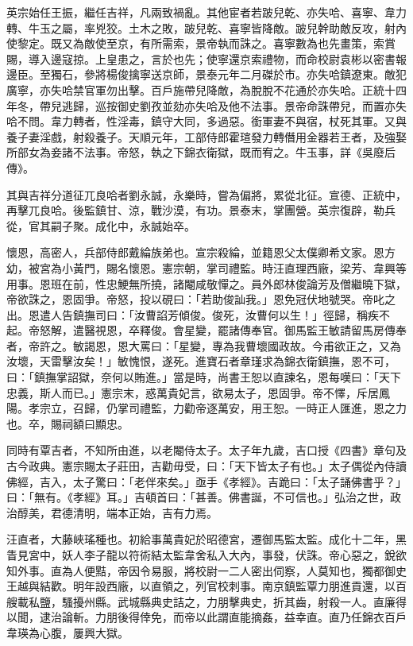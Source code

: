 \begin{pinyinscope}
英宗始任王振，繼任吉祥，凡兩致禍亂。其他宦者若跛兒乾、亦失哈、喜寧、韋力轉、牛玉之屬，率兇狡。土木之敗，跛兒乾、喜寧皆降敵。跛兒幹助敵反攻，射內使黎定。既又為敵使至京，有所需索，景帝執而誅之。喜寧數為也先畫策，索賞賜，導入邊寇掠。上皇患之，言於也先；使寧還京索禮物，而命校尉袁彬以密書報邊臣。至獨石，參將楊俊擒寧送京師，景泰元年二月磔於市。亦失哈鎮遼東。敵犯廣寧，亦失哈禁官軍勿出擊。百戶施帶兒降敵，為脫脫不花通於亦失哈。正統十四年冬，帶兒逃歸，巡按御史劉孜並劾亦失哈及他不法事。景帝命誅帶兒，而置亦失哈不問。韋力轉者，性淫毒，鎮守大同，多過惡。銜軍妻不與宿，杖死其軍。又與養子妻淫戲，射殺養子。天順元年，工部侍郎霍瑄發力轉僭用金器若王者，及強娶所部女為妾諸不法事。帝怒，執之下錦衣衛獄，既而宥之。牛玉事，詳《吳廢后傳》。

其與吉祥分道征兀良哈者劉永誠，永樂時，嘗為偏將，累從北征。宣德、正統中，再擊兀良哈。後監鎮甘、涼，戰沙漠，有功。景泰末，掌團營。英宗復辟，勒兵從，官其嗣子聚。成化中，永誠始卒。

懷恩，高密人，兵部侍郎戴綸族弟也。宣宗殺綸，並籍恩父太僕卿希文家。恩方幼，被宮為小黃門，賜名懷恩。憲宗朝，掌司禮監。時汪直理西廠，梁芳、韋興等用事。恩班在前，性忠鯁無所撓，諸閹咸敬憚之。員外郎林俊論芳及僧繼曉下獄，帝欲誅之，恩固爭。帝怒，投以硯曰：「若助俊訕我。」恩免冠伏地號哭。帝叱之出。恩遣人告鎮撫司曰：「汝曹諂芳傾俊。俊死，汝曹何以生！」徑歸，稱疾不起。帝怒解，遣醫視恩，卒釋俊。會星變，罷諸傳奉官。御馬監王敏請留馬房傳奉者，帝許之。敏謁恩，恩大罵曰：「星變，專為我曹壞國政故。今甫欲正之，又為汝壞，天雷擊汝矣！」敏愧恨，遂死。進寶石者章瑾求為錦衣衛鎮撫，恩不可，曰：「鎮撫掌詔獄，奈何以賄進。」當是時，尚書王恕以直諫名，恩每嘆曰：「天下忠義，斯人而已。」憲宗末，惑萬貴妃言，欲易太子，恩固爭。帝不懌，斥居鳳陽。孝宗立，召歸，仍掌司禮監，力勸帝逐萬安，用王恕。一時正人匯進，恩之力也。卒，賜祠額曰顯忠。

同時有覃吉者，不知所由進，以老閹侍太子。太子年九歲，吉口授《四書》章句及古今政典。憲宗賜太子莊田，吉勸毋受，曰：「天下皆太子有也。」太子偶從內侍讀佛經，吉入，太子驚曰：「老伴來矣。」亟手《孝經》。吉跪曰：「太子誦佛書乎？」曰：「無有。《孝經》耳。」吉頓首曰：「甚善。佛書誕，不可信也。」弘治之世，政治醇美，君德清明，端本正始，吉有力焉。

汪直者，大藤峽瑤種也。初給事萬貴妃於昭德宮，遷御馬監太監。成化十二年，黑眚見宮中，妖人李子龍以符術結太監韋舍私入大內，事發，伏誅。帝心惡之，銳欲知外事。直為人便黠，帝因令易服，將校尉一二人密出伺察，人莫知也，獨都御史王越與結歡。明年設西廠，以直領之，列官校刺事。南京鎮監覃力朋進貢還，以百艘載私鹽，騷擾州縣。武城縣典史詰之，力朋擊典史，折其齒，射殺一人。直廉得以聞，逮治論斬。力朋後得倖免，而帝以此謂直能摘姦，益幸直。直乃任錦衣百戶韋瑛為心腹，屢興大獄。


\end{pinyinscope}
